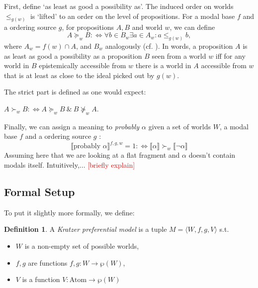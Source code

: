 \documentclass{article}
\theoremstyle{definition}
\newtheorem{definition}{Definition}
\newcommand\todo[1]{\textcolor{red}{#1}}
\newcommand{\lb}{\llbracket}
\newcommand{\rb}{\rrbracket}
\begin{document}
First, define `as least as good a possibility as'.
The induced order on worlds $\leq_{g(w)}$ is `lifted' to an order on the level of propositions.
For a modal base $f$ and a ordering source $g$, for propositions $A,B$ and world $w$, we can define
\begin{equation}
    \label{eq:lifted}
    A \succeq_w B :\iff \forall b \in B_w \exists a \in A_w: a \leq_{g(w)} b,
\end{equation}
where $A_w = f(w) \cap A$, and $B_w$ analogously (cf. \cite[][p.~519]{holliday13_measur}).
In words, a proposition $A$ is as least as good a possibility as a proposition $B$ seen from a world $w$ iff for any world in $B$ epistemically accessible from $w$ there is a world in $A$ accessible from $w$ that is at least as close to the ideal picked out by $g(w)$.

The strict part is defined as one would expect:

\noindent $A \succ_w B :\iff {A \succeq_w B ~\&~ B \not\succeq_w A}$.  

Finally, we can assign a meaning to \emph{probably $\alpha$} given a set of worlds $W$, a modal base $f$ and a ordering source $g$ \parencite[][p.~645]{kratzer91_modal}:
\begin{equation}
\llbracket \text{probably } \alpha \rrbracket^{f,g,w} = 1 :\iff \lb \alpha \rb \succ_w \lb \neg\alpha \rb
\end{equation}
Assuming here that we are looking at a flat fragment and $\alpha$ doesn't contain modals itself.
Intuitively,... \todo{[briefly explain]}

\subsection{Formal Setup}

To put it slightly more formally, we define: 
\begin{definition}
    A \emph{Kratzer preferential model} is a tuple $M = \langle W,f,g,V \rangle$ s.t.
    \begin{itemize}[nosep]
\renewcommand\labelitemi{--}
      \item $W$ is a non-empty set of possible worlds,
      \item $f,g$ are functions $f,g: W \rightarrow \wp(W)$,
      \item $V$ is a function $V: \text{Atom} \rightarrow \wp(W)$
    \end{itemize}
\end{definition}
\end{document}
